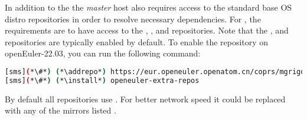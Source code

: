 In addition to the \OHPC{}
\iftoggle{isxCAT}{and \xCAT{} package repositories,}{package repository,}
the {\em master} host also requires access to the standard base OS distro
repositories in order to resolve necessary dependencies. For \baseOS{}, the
requirements are to have access to the {\color{purple}{OS}},
{\color{purple}{Everything}}, {\color{purple}{EPOL main}} and
{\color{purple}{EPOL update}} repositories.  Note that the
{\color{purple}{OS}}, {\color{purple}{Everything}} and {\color{purple}{EPOL
main}} repositories are typically enabled by default.  To enable the
{\color{purple}{EPOL update}} repository on openEuler-22.03, you can run the following
command:

\begin{lstlisting}[language=bash,keywords={},basicstyle=\fontencoding{T1}\fontsize{7.6}{10}\ttfamily]
[sms](*\#*) (*\addrepo*) https://eur.openeuler.openatom.cn/coprs/mgrigorov/OpenHPC/repo/openeuler-22.03_LTS_SP3/mgrigorov-OpenHPC-openeuler-22.03_LTS_SP3.repo
[sms](*\#*) (*\install*) openeuler-extra-repos
\end{lstlisting}


By default all repositories use {\color{blue}{http://repo.openeuler.org}}.
For better network speed it could be replaced with any of the mirrors listed
\href{https://www.openeuler.org/en/mirror/list/}{\color{blue}{here}}.
